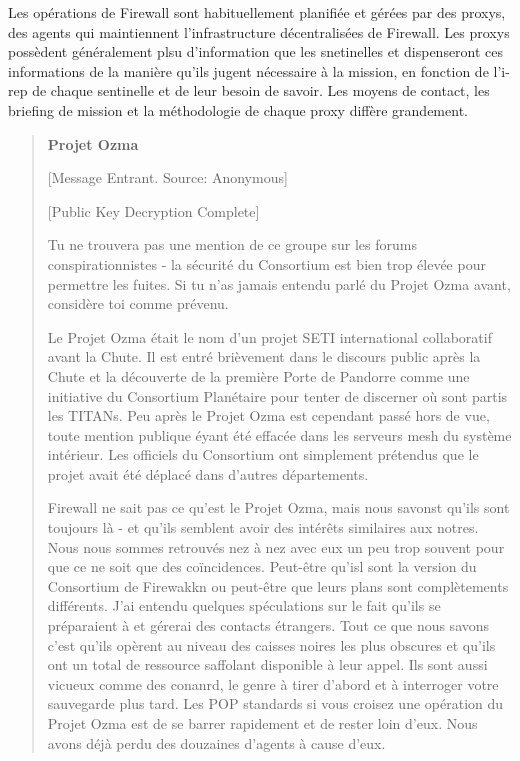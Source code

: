 Les opérations de Firewall sont habituellement planifiée et gérées par des proxys, des agents qui maintiennent l'infrastructure décentralisées de Firewall. Les proxys possèdent généralement plsu d'information que les snetinelles et dispenseront ces informations de la manière qu'ils jugent nécessaire à la mission, en fonction de l'i-rep de chaque sentinelle et de leur besoin de savoir. Les moyens de contact, les briefing de mission et la méthodologie de chaque proxy diffère grandement. 

\begin{quotation} \textbf{Projet Ozma} 

[Message Entrant. Source: Anonymous] 

[Public Key Decryption Complete] 

Tu ne trouvera pas une mention de ce groupe sur les forums conspirationnistes - la sécurité du Consortium est bien trop élevée pour permettre les fuites. Si tu n'as jamais entendu parlé du Projet Ozma avant, considère toi comme prévenu. 

Le Projet Ozma était le nom d'un projet SETI international collaboratif avant la Chute. Il est entré brièvement dans le discours public après la Chute et la découverte de la première Porte de Pandorre  comme une initiative du Consortium Planétaire pour tenter de discerner où sont partis les TITANs. Peu après le Projet Ozma est cependant passé hors de vue, toute mention publique éyant été effacée dans les serveurs mesh du système intérieur. Les officiels du Consortium ont simplement prétendus que le projet avait été déplacé dans d'autres départements. 

Firewall ne sait pas ce qu'est le Projet Ozma, mais nous savonst qu'ils sont toujours là - et qu'ils semblent avoir des intérêts similaires aux notres. Nous nous sommes retrouvés nez à nez avec eux un peu trop souvent pour que ce ne soit que des coïncidences. Peut-être qu'isl sont la version du Consortium de Firewakkn ou peut-être que leurs plans sont complètements différents. J'ai entendu quelques spéculations sur le fait qu'ils se préparaient à et gérerai des contacts étrangers. Tout ce que nous savons c'est qu'ils opèrent au niveau des caisses noires les plus obscures et qu'ils ont un total de ressource saffolant disponible à leur appel. Ils sont aussi vicueux comme des conanrd, le genre à tirer d'abord et à interroger votre sauvegarde plus tard. Les POP standards si vous croisez une opération du Projet Ozma est de se barrer rapidement et de rester loin d'eux. Nous avons déjà perdu des douzaines d'agents à cause d'eux. \end{quotation} 

